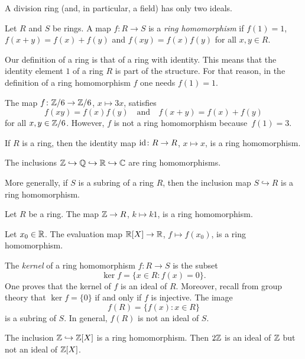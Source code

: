 A division ring (and, in particular, a field) has only two ideals. 

\begin{definition}
Let $R$ and $S$ be rings. A map $f\colon R\to S$ is a \emph{ring homomorphism}  
if $f(1)=1$, $f(x+y)=f(x)+f(y)$ and $f(xy)=f(x)f(y)$ for all $x,y\in R$. 	
\end{definition}

Our definition of a ring is that of a ring with identity. This means
that the identity element $1$ of a ring $R$ 
is part of the structure. For that reason, in 
the definition
of a ring homomorphism $f$ one needs $f(1)=1$.  

\begin{example}
The map $f\colon\mathbb{Z}/6\to\mathbb{Z}/6$, $x\mapsto 3x$, satisfies 
\[
f(xy)=f(x)f(y)\quad\text{and}\quad f(x+y)=f(x)+f(y)
\]
for all $x,y\in\mathbb{Z}/6$. However, $f$ is not a ring homomorphism because~$f(1)=3$. 	
\end{example}
 
If $R$ is a ring, then  
the identity map $\operatorname{id}\colon R\to R$, $x\mapsto x$, is a ring homomorphism. 	

\begin{example}
The inclusions $\mathbb{Z}\hookrightarrow\mathbb{Q}\hookrightarrow\mathbb{R}\hookrightarrow\mathbb{C}$ 
are ring homomorphisms. 	
\end{example}

More generally, if $S$ is a subring of a ring $R$, then the inclusion map 
$S\hookrightarrow R$ is a ring homomorphism. 

\begin{example}
Let $R$ be a ring. 
The map $\mathbb{Z}\to R$, $k\mapsto k1$, is a ring homomorphism. 	
\end{example}

\begin{example}
Let $x_0\in\mathbb{R}$. The evaluation map $\mathbb{R}[X]\to\mathbb{R}$, $f\mapsto f(x_0)$, 
is a ring homomorphism. 	
\end{example}

The \emph{kernel} of a ring homomorphism
$f\colon R\to S$ is the subset
\[
\ker f=\{x\in R:f(x)=0\}.
\]
One proves that the kernel of $f$ is an ideal of $R$.  
Moreover, recall from group theory that 
$\ker f=\{0\}$ if and only if $f$ is injective. The image 
\[
f(R)=\{f(x):x\in R\}
\]
is a subring of $S$. In general, $f(R)$ is not an ideal of $S$. 

\begin{example}
The inclusion $\mathbb{Z}\hookrightarrow\mathbb{Z}[X]$ is a ring homomorphism. Then
$2\mathbb{Z}$ is an ideal of $\mathbb{Z}$ but not an ideal of $\mathbb{Z}[X]$. 
\end{example}

